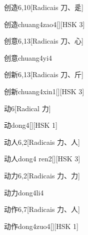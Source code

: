 \begin{entry}{创造}{6,10}[Radicais ⼑、⾡]
  \begin{phonetics}{创造}{chuang4zao4}[][HSK 3]
  \end{phonetics}
\end{entry}

\begin{entry}{创意}{6,13}[Radicais ⼑、⼼]
  \begin{phonetics}{创意}{chuang4yi4}
  \end{phonetics}
\end{entry}

\begin{entry}{创新}{6,13}[Radicais ⼑、⽄]
  \begin{phonetics}{创新}{chuang4xin1}[][HSK 3]
  \end{phonetics}
\end{entry}

\begin{entry}{动}{6}[Radical ⼒]
  \begin{phonetics}{动}{dong4}[][HSK 1]
  \end{phonetics}
\end{entry}

\begin{entry}{动人}{6,2}[Radicais ⼒、⼈]
  \begin{phonetics}{动人}{dong4 ren2}[][HSK 3]
  \end{phonetics}
\end{entry}

\begin{entry}{动力}{6,2}[Radicais ⼒、⼒]
  \begin{phonetics}{动力}{dong4li4}
  \end{phonetics}
\end{entry}

\begin{entry}{动作}{6,7}[Radicais ⼒、⼈]
  \begin{phonetics}{动作}{dong4zuo4}[][HSK 1]
  \end{phonetics}
\end{entry}

